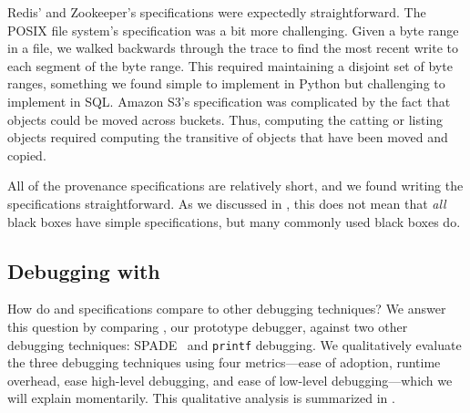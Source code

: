Redis' and Zookeeper's \watprovenance{} specifications were expectedly
straightforward.
%
The POSIX file system's \watprovenance{} specification was a bit more
challenging.  Given a byte range in a file, we walked backwards through the
trace to find the most recent write to each segment of the byte range. This
required maintaining a disjoint set of byte ranges, something we found simple
to implement in Python but challenging to implement in SQL.
%
Amazon S3's \watprovenance{} specification was complicated by the fact that
objects could be moved across buckets. Thus, computing the \watprovenance{}
catting or listing objects required computing the transitive \watprovenance{}
of objects that have been moved and copied.


All of the provenance specifications are relatively short, and we found writing
the specifications straightforward. As we discussed in
, this does not mean that \emph{all}
black boxes have simple \watprovenance{} specifications, but many commonly used
black boxes do.



\subsection{Debugging with \WatProvenance}
How do \watprovenance{} and \watprovenance{} specifications compare to other
debugging techniques? We answer this question by comparing \fluent{}, our
prototype \watprovenance{} debugger, against two other debugging techniques:
SPADE~\cite{gehani2012spade} and \texttt{printf} debugging. We qualitatively
evaluate the three debugging techniques using four metrics---ease of adoption,
runtime overhead, ease high-level debugging, and ease of low-level
debugging---which we will explain momentarily. This qualitative analysis is
summarized in .

